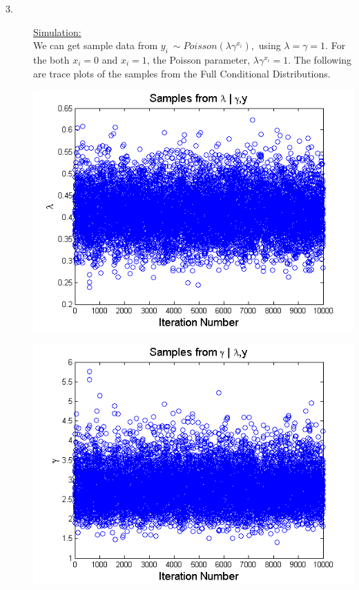 \documentclass{article}
\begin{document}
\begin{description}
\item[3.   ] \underline{Simulation:}\\
We can get sample data from $y_i ~\sim Poisson(\lambda\gamma^{x_i}),$ using $\lambda = \gamma = 1.$ For the both $x_i=0$ and $x_i=1$, the Poisson parameter, $\lambda\gamma^{x_i}=1.$ The following are trace plots of the samples from the Full Conditional Distributions.\\

\begin{left}
\includegraphics[scale=0.5]{LGivenGAndY.png}
\end{left}
\begin{right}
\includegraphics[scale=0.5]{GGivenLAndY.png}\\

\end{right}
\end{description}
\end{document}
